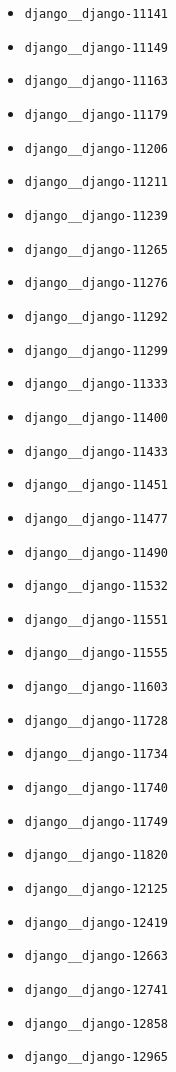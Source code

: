 \begin{multicols}{2}
\begin{itemize}
    \item \texttt{django\_\_django-11141}
    \item \texttt{django\_\_django-11149}
    \item \texttt{django\_\_django-11163}
    \item \texttt{django\_\_django-11179}
    \item \texttt{django\_\_django-11206}
    \item \texttt{django\_\_django-11211}
    \item \texttt{django\_\_django-11239}
    \item \texttt{django\_\_django-11265}
    \item \texttt{django\_\_django-11276}
    \item \texttt{django\_\_django-11292}
    \item \texttt{django\_\_django-11299}
    \item \texttt{django\_\_django-11333}
    \item \texttt{django\_\_django-11400}
    \item \texttt{django\_\_django-11433}
    \item \texttt{django\_\_django-11451}
    \item \texttt{django\_\_django-11477}
    \item \texttt{django\_\_django-11490}
    \item \texttt{django\_\_django-11532}
    \item \texttt{django\_\_django-11551}
    \item \texttt{django\_\_django-11555}
    \item \texttt{django\_\_django-11603}
    \item \texttt{django\_\_django-11728}
    \item \texttt{django\_\_django-11734}
    \item \texttt{django\_\_django-11740}
    \item \texttt{django\_\_django-11749}
    \item \texttt{django\_\_django-11820}
    \item \texttt{django\_\_django-12125}
    \item \texttt{django\_\_django-12419}
    \item \texttt{django\_\_django-12663}
    \item \texttt{django\_\_django-12741}
    \item \texttt{django\_\_django-12858}
    \item \texttt{django\_\_django-12965}

\end{itemize}
\end{multicols}
